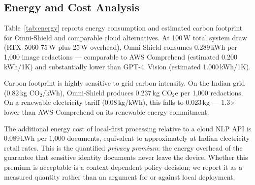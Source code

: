 \subsection{Energy and Cost Analysis}



Table~\ref{tab:energy} reports energy consumption
and estimated carbon footprint for Omni-Shield and
comparable cloud alternatives.
At 100\,W total system draw (RTX~5060 75\,W plus
25\,W overhead), Omni-Shield consumes 0.289\,kWh
per 1,000 image redactions --- comparable to AWS
Comprehend (estimated 0.200\,kWh/1K) and
substantially lower than GPT-4~Vision
(estimated 1.000\,kWh/1K).

Carbon footprint is highly sensitive to grid carbon
intensity.
On the Indian grid (0.82\,kg CO$_2$/kWh),
Omni-Shield produces 0.237\,kg CO$_2$e per 1,000
redactions.
On a renewable electricity tariff (0.08\,kg/kWh),
this falls to 0.023\,kg --- 1.3$\times$ lower than
AWS Comprehend on its renewable energy commitment.

The additional energy cost of local-first processing
relative to a cloud NLP API is 0.089\,kWh per 1,000
documents, equivalent to approximately  at
Indian electricity retail rates.
This is the quantified \emph{privacy premium}: the
energy overhead of the guarantee that sensitive
identity documents never leave the device.
Whether this premium is acceptable is a
context-dependent policy decision; we report it
as a measured quantity rather than an argument for
or against local deployment.
